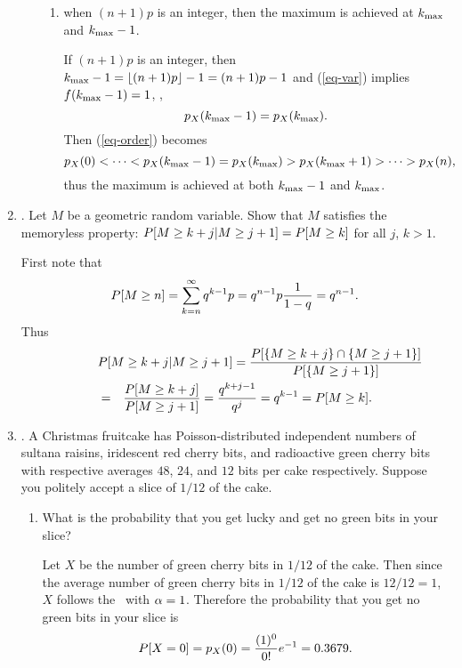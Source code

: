 \begin{enumerate}
\begin{enumerate}
\begin{enumerate}
			\item when $(n + 1)p$ is an integer,
			then the maximum is achieved at $k_\mathrm{max}$ and $k_\mathrm{max}-1$.
			\ifdefined\sol
			\begin{solution}
				If $(n+1)p$ is an integer,
				then
				$k_\mathrm{max}-1 = \lfloor (n+1)p \rfloor -1 = (n+1)p -1 $
				and (\ref{eq-var}) implies $f(k_\mathrm{max}-1)=1$,
				\ie,
				\[
					p_{X}(k_\mathrm{max}-1) = p_{X}(k_\mathrm{max}).
				\]
				Then (\ref{eq-order}) becomes
			\begin{equation}
			\label{eq-order-1}
				p_{X}(0) < \cdots
				< p_{X}(k_\mathrm{max}-1) = p_{X}(k_\mathrm{max})
				> p_{X}(k_\mathrm{max}+1) > \cdots > p_{X}(n),
			\end{equation}
			thus the maximum is achieved at both $k_\mathrm{max}-1$ and $k_\mathrm{max}$.
			\end{solution}
			\fi
		\end{enumerate}
	\end{enumerate}

	\item \lgprob{3.54}.
	Let $M$ be a geometric random variable.
	Show that $M$ satisfies the memoryless property:
	$P[M \geq k + j|M \geq j + 1] = P[M \geq k]$ for all $j$, $k > 1$.
	\ifdefined\sol
	\begin{solution}
		First note that
		\[
			P[M\geq n] = \sum_{k=n}^{\infty} q^{k-1}p
			= q^{n-1}p \frac{1}{1-q} = q^{n-1}.
		\]
		Thus
		\begin{eqnarray*}
			\lefteqn{
			\cpr{M \geq k + j}{M \geq j + 1}
			= \cprbeq{M \geq k + j}{M \geq j + 1}
			}
			\\&=&
			\frac{\pr{M \geq k+j}}{\pr{M\geq j+1}}
			= \frac{q^{k+j-1}}{q^{j}}
			= q^{k-1}
			= \pr{M\geq k}.
		\end{eqnarray*}
	\end{solution}
	\fi


	\item \lgprob{3.57}.
	A Christmas fruitcake has Poisson-distributed independent
	numbers of sultana raisins,
	iridescent red cherry bits,
	and radioactive green cherry bits with respective averages
	$48$, $24$, and $12$ bits per cake
	respectively.
	Suppose you politely accept a slice of $1/12$ of the cake.
	\begin{enumerate}
		\item What is the probability that you get lucky and get no green bits in your slice?
		\ifdefined\sol
		\begin{solution}
			Let $X$ be the number of green cherry bits in $1/12$ of the cake.
			Then since the average number of green cherry bits in $1/12$ of the cake is $12/12=1$,
			$X$ follows the \possdist\ with $\alpha=1$.
			Therefore the probability that you get no green bits in your slice is
			\[
				P[X=0]
				= p_{X}(0) = \frac{(1)^0}{0!}e^{-1} = 0.3679.
			\]
		\end{solution}
		\fi


\end{enumerate}
\end{enumerate}
